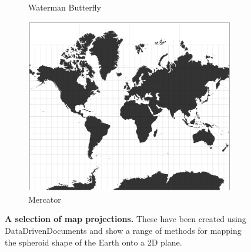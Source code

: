 \begin{figure}[H]
\begin{subfigure}[b]{.3\textwidth}
     \caption{Waterman Butterfly}
     \end{subfigure}
     \begin{subfigure}[b]{.3\textwidth}
         \centering
     \includegraphics[width=\textwidth]{figures_c1/layout/mercator.png}
     \caption{Mercator}
     \end{subfigure}
        \caption{\textbf{A selection of map projections.} These have been created using DataDrivenDocuments \citep{d3js} and show a range of methods for mapping the spheroid shape of the Earth onto a 2D plane. }
      \label{fig:projections}
\end{figure}



